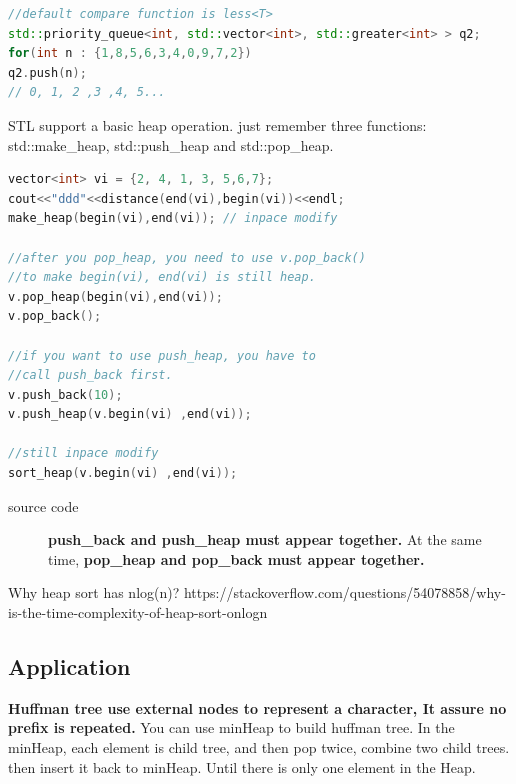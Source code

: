 \documentclass[a4paper,11pt,twoside]{book}
\begin{document}
\begin{lstlisting}[frame=single, language=c++, mathescape=true, basicstyle=\scriptsize]
//default compare function is less<T>
std::priority_queue<int, std::vector<int>, std::greater<int> > q2;
for(int n : {1,8,5,6,3,4,0,9,7,2})
q2.push(n);
// 0, 1, 2 ,3 ,4, 5...		
\end{lstlisting}


\par STL support a basic heap operation. just remember three functions: std::make\_heap, std::push\_heap and std::pop\_heap.

\begin{lstlisting}[frame=single, language=c++, mathescape=true]
vector<int> vi = {2, 4, 1, 3, 5,6,7};
cout<<"ddd"<<distance(end(vi),begin(vi))<<endl;
make_heap(begin(vi),end(vi)); // inpace modify

//after you pop_heap, you need to use v.pop_back()
//to make begin(vi), end(vi) is still heap. 
v.pop_heap(begin(vi),end(vi));
v.pop_back();

//if you want to use push_heap, you have to 
//call push_back first. 
v.push_back(10);
v.push_heap(v.begin(vi) ,end(vi));

//still inpace modify
sort_heap(v.begin(vi) ,end(vi));	
\end{lstlisting}
\begin{description}
	\item[source code] \textbf{push\_back and push\_heap must appear together.} At the same time, \textbf{pop\_heap and pop\_back must appear together. }
\end{description}


\par Why heap sort has nlog(n)? https://stackoverflow.com/questions/54078858/why-is-the-time-complexity-of-heap-sort-onlogn

\subsection{Application}


\par \textbf{Huffman tree use external nodes to represent a character, It assure no prefix is repeated.} You can use minHeap to build huffman tree. In the minHeap, each element is child tree, and then pop twice, combine two child trees. then insert it back to minHeap. Until there is only one element in the Heap. 
\end{document}

